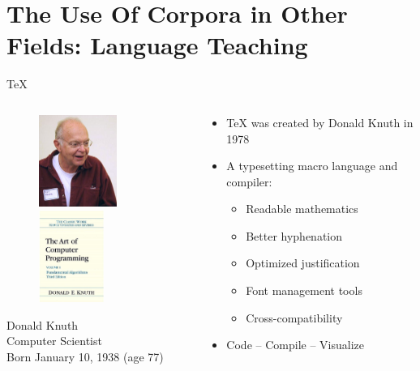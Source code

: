 \documentclass{beamer}
\begin{document}
\section{The Use Of Corpora in Other Fields: Language Teaching}

\begin{frame}{\TeX{}}
	\begin{columns}
		\begin{column}{4cm}
			\begin{figure}
   				\includegraphics[height=3cm]{384px-KnuthAtOpenContentAlliance.jpg}
   				\includegraphics[height=3cm]{ArtOfComputerProgramming.jpg}
			\end{figure}
			\begin{center}
				\tiny
				Donald Knuth \\
				Computer Scientist \\
				Born January 10, 1938 (age 77) \\
			\end{center}
		\end{column}
		
        \begin{column}{6cm}
			\begin{itemize}
				\item \TeX{} was created by Donald Knuth in 1978
				\pause
				\item A typesetting macro language and compiler:
				\begin{itemize}
					\item Readable mathematics
					\item Better hyphenation
					\item Optimized justification
					\item Font management tools
					\item Cross-compatibility
				\end{itemize}
				\pause
				\item Code -- Compile -- Visualize
			\end{itemize}
		\end{column}
	\end{columns}
\end{frame}
\end{document}
